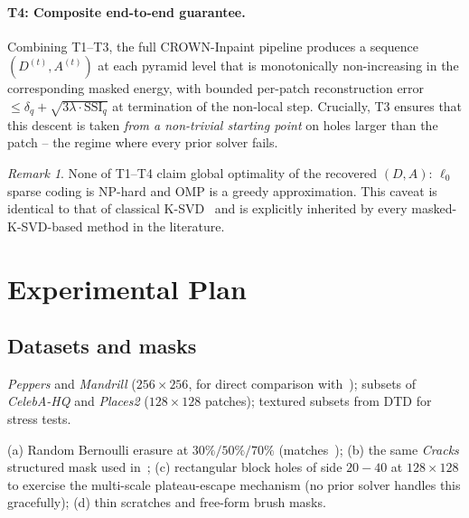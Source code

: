 \documentclass[11pt,a4paper]{article}
\theoremstyle{definition}
\theoremstyle{remark}
\newtheorem*{remark}{Remark}
\begin{document}
\paragraph{T4: Composite end-to-end guarantee.}
Combining T1--T3, the full CROWN-Inpaint pipeline produces a sequence
$(D^{(t)},A^{(t)})$ at each pyramid level that is monotonically
non-increasing in the corresponding masked energy, with bounded
per-patch reconstruction error
$\le \delta_q+\sqrt{3\lambda\cdot\mathrm{SSI}_q}$ at termination of
the non-local step. Crucially, T3 ensures that this descent is taken
\emph{from a non-trivial starting point} on holes larger than the
patch -- the regime where every prior solver fails.

\begin{remark}
None of T1--T4 claim global optimality of the recovered $(D,A)$:
$\ell_0$ sparse coding is NP-hard and OMP is a greedy approximation.
This caveat is identical to that of classical
K-SVD~\cite{aharon2006ksvd} and is explicitly inherited by every
masked-K-SVD-based method in the literature.
\end{remark}

\section{Experimental Plan}

\subsection{Datasets and masks}
\begin{description}[leftmargin=2.5em,itemsep=2pt]
\item[Datasets.] \emph{Peppers} and \emph{Mandrill} ($256\times 256$,
  for direct comparison with~\cite{tiefenthaler2018thesis}); subsets
  of \emph{CelebA-HQ} and \emph{Places2} ($128\times 128$ patches);
  textured subsets from DTD for stress tests.
\item[Masks.] (a) Random Bernoulli erasure at $30\%/50\%/70\%$
  (matches~\cite{tiefenthaler2018thesis}); (b) the same \emph{Cracks}
  structured mask used in~\cite{tiefenthaler2018thesis}; (c)
  rectangular block holes of side $20{-}40$ at $128\times 128$ to
  exercise the multi-scale plateau-escape mechanism (no prior solver
  handles this gracefully); (d) thin scratches and free-form brush
  masks.
\end{description}
\end{document}
